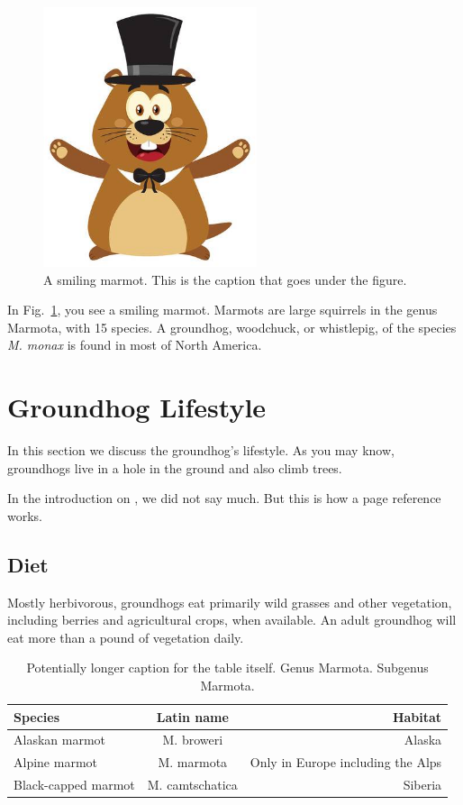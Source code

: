 \documentclass{article}
\begin{document}
\lipsum[1]

\begin{figure}[H]
    \centering
    \includegraphics[height=3in]{figures/smiling-marmot.jpg}
    \caption[Optional caption for list of figures]{A smiling marmot.  This is the caption that goes under the figure.}
    \label{fig:smiling-marmot}
\end{figure}

In Fig.~\ref{fig:smiling-marmot}, you see a smiling marmot.  Marmots are large squirrels in the
genus Marmota, with 15 species.  A groundhog, woodchuck, or whistlepig, of the species \textit{M. monax}
is found in most of North America.


\newpage
\section{Groundhog Lifestyle}
In this section we discuss the groundhog's lifestyle.  As you may know, groundhogs live in a hole
in the ground and also climb trees.

In the introduction on \pageref{sec:intro}, we did not say much.  But this is how a page reference
works.

\subsection{Diet}
Mostly herbivorous, groundhogs eat primarily wild grasses and other vegetation, including berries
and agricultural crops, when available.  An adult groundhog will eat more than a pound of vegetation daily.

\begin{table}[H]    %
    \centering
    \caption[Optional table caption for table of contents]{Potentially longer caption for the table itself.
    \label{tab:species}
    Genus Marmota.  Subgenus Marmota.}
    \begin{tabular}{l c r}    %
    Species & Latin name & Habitat\\ \hline
    Alaskan marmot & M. broweri & Alaska\\
    Alpine marmot & M. marmota & Only in Europe including the Alps\\
    Black-capped marmot & M. camtschatica & Siberia\\
    \end{tabular}
\end{table}
\end{document}
